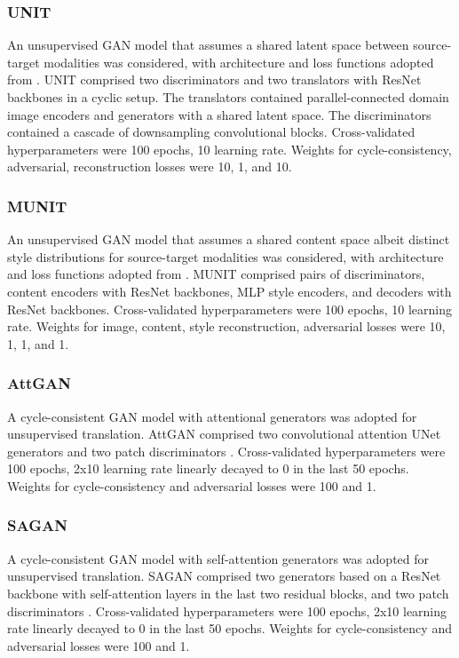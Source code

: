\documentclass[journal,twoside,web]{ieeecolor}
\begin{document}
\subsubsection{UNIT}
An unsupervised GAN model that assumes a shared latent space between source-target modalities was considered, with architecture and loss functions adopted from \cite{NIPS2017_dc6a6489}. UNIT comprised two discriminators and two translators with ResNet backbones in a cyclic setup. The translators contained parallel-connected domain image encoders and generators with a shared latent space. The discriminators contained a cascade of downsampling convolutional blocks. Cross-validated hyperparameters were 100 epochs, 10 learning rate. Weights for cycle-consistency, adversarial, reconstruction losses were 10, 1, and 10.

\subsubsection{MUNIT}
An unsupervised GAN model that assumes a shared content space albeit distinct style distributions for source-target modalities was considered, with architecture and loss functions adopted from \cite{munit}. MUNIT comprised pairs of discriminators, content encoders with ResNet backbones, MLP style encoders, and decoders with ResNet backbones. Cross-validated hyperparameters were 100 epochs, 10 learning rate. Weights for image, content, style reconstruction, adversarial losses were 10, 1, 1, and 1.


\subsubsection{AttGAN}
A cycle-consistent GAN model with attentional generators \cite{attention_unet} was adopted for unsupervised translation. AttGAN comprised two convolutional attention UNet generators and two patch discriminators \cite{attention_unet}. Cross-validated hyperparameters were 100 epochs, 2x10 learning rate linearly decayed to 0 in the last 50 epochs. Weights for cycle-consistency and adversarial losses were 100 and 1.

\subsubsection{SAGAN}
A cycle-consistent GAN model with self-attention generators \cite{sagan} was adopted for unsupervised translation. SAGAN comprised two generators based on a ResNet backbone with self-attention layers in the last two residual blocks, and two patch discriminators \cite{sagan}. Cross-validated hyperparameters were 100 epochs, 2x10 learning rate linearly decayed to 0 in the last 50 epochs. Weights for cycle-consistency and adversarial losses were 100 and 1.
\end{document}
